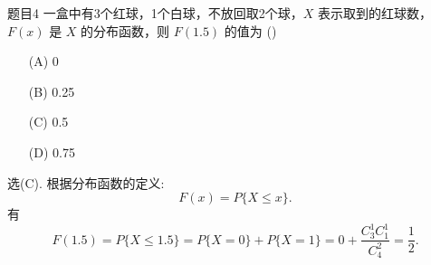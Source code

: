 \documentclass{article}
\begin{document}
\begin{question}{题目4}
    一盒中有3个红球，1个白球，不放回取2个球，$X$ 表示取到的红球数，$F(x)$ 是 $X$ 的分布函数，则 $F(1.5)$ 的值为 (\quad \quad)
    \begin{multicols}{4}
        \begin{itemize}
            \item [(A)] 0
            \item [(B)] 0.25
            \item [(C)] 0.5
            \item [(D)] 0.75
        \end{itemize}
    \end{multicols}
\end{question}
\begin{solution}
    选(C).  根据分布函数的定义:
    $$
        F(x) = P\{X \leqslant x\}.
    $$
    有
    $$
        F(1.5) = P\{X \leqslant 1.5\}
        = P\{X=0\} + P\{X=1\}
        = 0 + \frac{C_3^1C_1^1}{C_4^2}
        = \frac{1}{2}.
    $$
\end{solution}
\end{document}
